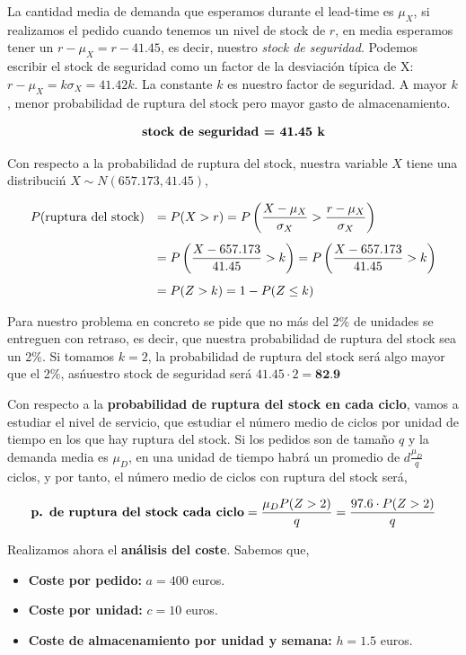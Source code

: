 \documentclass[a4paper,12pt]{article}
\begin{document}
\begin{itemize}
La cantidad media de demanda que esperamos durante el lead-time es $\mu_X$, si realizamos el pedido cuando tenemos un nivel de stock de $r$, en media esperamos tener un $r - \mu_X = r - 41.45$, es decir, nuestro \textit{stock de seguridad}. Podemos escribir el stock de seguridad como un factor de la desviaci\'on t\'ipica de X: $r - \mu_X = k\sigma_X =  41.42 k$. La constante $k$ es nuestro factor de seguridad. A mayor $k$, menor probabilidad de ruptura del stock pero mayor gasto de almacenamiento. 

$$ \textbf{\text{stock de seguridad} = 41.45 k}$$

Con respecto a la probabilidad de ruptura del stock, nuestra variable $X$ tiene una distribuci\'n $ X\sim N(657.173, 41.45)$,

\begin{equation*}
\begin{array}{l l}
 P(\text{ruptura del stock}) & =  P(X > r) = P\left(\dfrac{X - \mu_X}{\sigma_X} > \dfrac{r-\mu_X}{\sigma_X}\right) \\[0.5cm]
 \, &   = P\left(\dfrac{X - 657.173}{41.45} > k\right) = P\left(\dfrac{X - 657.173}{41.45} > k\right) \\[0.5cm]
 \, &   = P(Z > k) = 1 - P(Z \leq k)
\end{array}
\end{equation*}

Para nuestro problema en concreto se pide que no m\'as del 2\% de unidades se entreguen con retraso, es decir, que nuestra probabilidad de ruptura del stock sea un 2\%. Si tomamos $k = 2$, la probabilidad de ruptura del stock ser\'a algo mayor que el 2\%, as\' nuestro stock de seguridad ser\'a $41.45 \cdot 2 = \textbf{82.9}$


Con respecto a la \textbf{probabilidad de ruptura del stock en cada ciclo}, vamos a estudiar el nivel de servicio, que estudiar el n\'umero medio de ciclos por unidad de tiempo en los que hay ruptura del stock. Si los pedidos son de tama\~no $q$ y la demanda media es $\mu_D$, en una unidad de tiempo habr\'a un promedio de $d\frac{\mu_D}{q}$ ciclos, y por tanto, el n\'umero medio de ciclos con ruptura del stock ser\'a,

$$ \text{\textbf{p. de ruptura del stock cada ciclo}} = \frac{\mu_D P(Z > 2)}{q} = \frac{97.6\cdot P(Z > 2)}{q}  $$

Realizamos ahora el \textbf{an\'alisis del coste}. Sabemos que,

\begin{itemize}
\item[] \textbf{Coste por pedido:} $a = 400$ euros.
\item[] \textbf{Coste por unidad:} $c = 10$ euros.
\item[] \textbf{Coste de almacenamiento por unidad y semana:} $h = 1.5$ euros.


\end{itemize}
\end{itemize}
\end{document}
